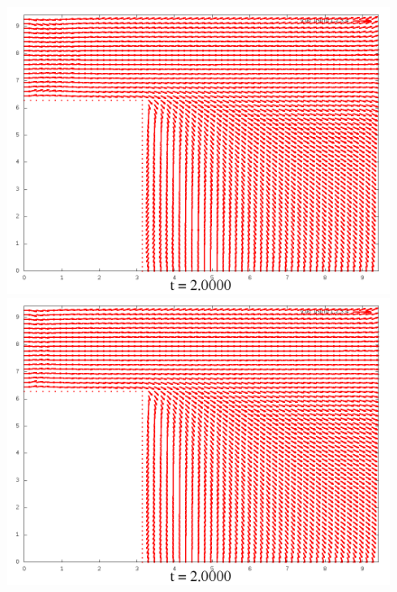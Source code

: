 \documentclass[a4paper, 12pt]{article}
\begin{document}
\begin{figure}[h]
	\begin{minipage}[h]{0.4\linewidth}
		\includegraphics[width=1\linewidth]{./img/01_1_1/V/10}
	\end{minipage}
	\hfill
	\begin{minipage}[h]{0.4\linewidth}
		\includegraphics[width=1\linewidth]{./img/01_1_01/V/10}
	\end{minipage}
\end{figure}
\end{document}
